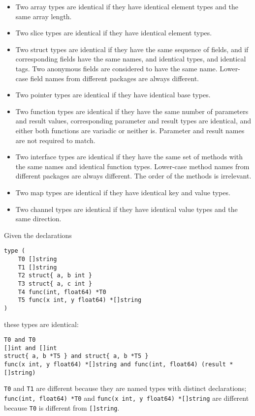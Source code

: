 \begin{itemize}
\item
  Two array types are identical if they have identical element types and
  the same array length.
\item
  Two slice types are identical if they have identical element types.
\item
  Two struct types are identical if they have the same sequence of
  fields, and if corresponding fields have the same names, and identical
  types, and identical tags. Two anonymous fields are considered to have
  the same name. Lower-case field names from different packages are
  always different.
\item
  Two pointer types are identical if they have identical base types.
\item
  Two function types are identical if they have the same number of
  parameters and result values, corresponding parameter and result types
  are identical, and either both functions are variadic or neither is.
  Parameter and result names are not required to match.
\item
  Two interface types are identical if they have the same set of methods
  with the same names and identical function types. Lower-case method
  names from different packages are always different. The order of the
  methods is irrelevant.
\item
  Two map types are identical if they have identical key and value
  types.
\item
  Two channel types are identical if they have identical value types and
  the same direction.
\end{itemize}

Given the declarations

\begin{Verbatim}[frame=single]
type (
    T0 []string
    T1 []string
    T2 struct{ a, b int }
    T3 struct{ a, c int }
    T4 func(int, float64) *T0
    T5 func(x int, y float64) *[]string
)
\end{Verbatim}

these types are identical:

\begin{Verbatim}[frame=single]
T0 and T0
[]int and []int
struct{ a, b *T5 } and struct{ a, b *T5 }
func(x int, y float64) *[]string and func(int, float64) (result *[]string)
\end{Verbatim}

\texttt{T0} and \texttt{T1} are different because they are named types
with distinct declarations; \texttt{func(int, float64) *T0} and
\texttt{func(x int, y float64) *{[}{]}string} are different because
\texttt{T0} is different from \texttt{{[}{]}string}.

